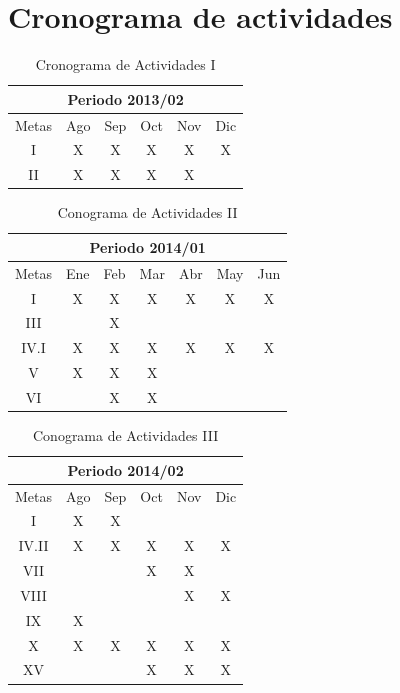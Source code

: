 \section{Cronograma de actividades}



\begin{table}[h]
\centering
%

\begin{tabular}{|c|c|c|c|c|c|}
\hline
\multicolumn{6}{|c|}{Periodo 2013/02}\tabularnewline
\hline
\hline
Metas & Ago & Sep & Oct & Nov & Dic\tabularnewline
\hline
I & X & X & X & X & X\tabularnewline
\hline
II & X & X & X & X & \tabularnewline
\hline


\end{tabular}

\caption{Cronograma de Actividades I}
\label{reglasI}
\end{table}%



\begin{table}[h]
\centering
%

\begin{tabular}{|c|c|c|c|c|c|c|}
\hline
\multicolumn{7}{|c|}{Periodo 2014/01}\tabularnewline
\hline
\hline
Metas & Ene & Feb & Mar & Abr & May & Jun\tabularnewline
\hline
I & X & X & X & X & X & X\tabularnewline
\hline
III &  & X &  &  &  & \tabularnewline
\hline
IV.I & X & X & X & X & X & X\tabularnewline
\hline
V & X & X & X &  &  & \tabularnewline
\hline
VI &  & X & X &  &  & \tabularnewline
\hline


\end{tabular}
%

\caption{Conograma de Actividades II}
\label{reglasII}
\end{table}%



\begin{table}[h]
\centering
%

\begin{tabular}{|c|c|c|c|c|c|}
\hline
\multicolumn{6}{|c|}{Periodo 2014/02}\tabularnewline
\hline
\hline
Metas & Ago & Sep & Oct & Nov & Dic\tabularnewline
\hline
I & X & X &  &  & \tabularnewline
\hline
IV.II & X & X & X & X & X\tabularnewline
\hline
VII &  &  & X & X & \tabularnewline
\hline
VIII &  &  &  & X & X \tabularnewline
\hline
IX & X &  &  &  & \tabularnewline
\hline
X & X & X & X & X & X\tabularnewline
\hline
XV &  &  & X & X & X\tabularnewline
\hline
\end{tabular}
%

\caption{Conograma de Actividades III}
\label{reglasIII}
\end{table}%




